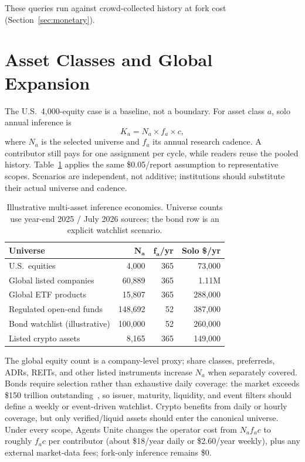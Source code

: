\documentclass[10pt,twocolumn]{article}
\begin{document}
These queries run against crowd-collected history at fork cost (Section~\ref{sec:monetary}).

\section{Asset Classes and Global Expansion}

The U.S.\ 4{,}000-equity case is a baseline, not a boundary. For asset class $a$, solo annual inference is
\begin{equation}
  K_a = N_a \times f_a \times c,
\end{equation}
where $N_a$ is the selected universe and $f_a$ its annual research cadence. A contributor still pays for one assignment per cycle, while readers reuse the pooled history. Table~\ref{tab:multiasset} applies the same \$0.05/report assumption to representative scopes. Scenarios are independent, not additive; institutions should substitute their actual universe and cadence.

\begin{table}[h]
\centering
\caption{Illustrative multi-asset inference economics. Universe counts use year-end 2025 / July 2026 sources; the bond row is an explicit watchlist scenario.}
\label{tab:multiasset}
\scriptsize
\begin{tabular}{@{}lrrr@{}}
\toprule
\textbf{Universe} & $\mathbf{N_a}$ & $\mathbf{f_a}$/yr & \textbf{Solo \$/yr} \\
\midrule
U.S.\ equities & 4{,}000 & 365 & 73{,}000 \\
Global listed companies~\cite{wfe2025} & 60{,}889 & 365 & 1.11M \\
Global ETF products~\cite{etfgi2025} & 15{,}807 & 365 & 288{,}000 \\
Regulated open-end funds~\cite{ici2026} & 148{,}692 & 52 & 387{,}000 \\
Bond watchlist (illustrative) & 100{,}000 & 52 & 260{,}000 \\
Listed crypto assets~\cite{coinmarketcap2026} & 8{,}165 & 365 & 149{,}000 \\
\bottomrule
\end{tabular}
\end{table}

The global equity count is a company-level proxy; share classes, preferreds, ADRs, REITs, and other listed instruments increase $N_a$ when separately covered. Bonds require selection rather than exhaustive daily coverage: the market exceeds \$150 trillion outstanding~\cite{bis-bonds2025}, so issuer, maturity, liquidity, and event filters should define a weekly or event-driven watchlist. Crypto benefits from daily or hourly coverage, but only verified/liquid assets should enter the canonical universe. Under every scope, Agents Unite changes the operator cost from $N_a f_a c$ to roughly $f_a c$ per contributor (about \$18/year daily or \$2.60/year weekly), plus any external market-data fees; fork-only inference remains \$0.
\end{document}
